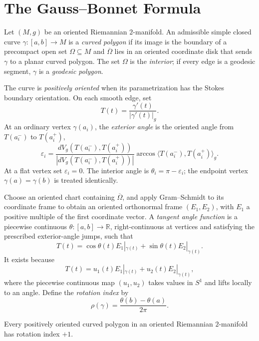 \section{The Gauss--Bonnet Formula}

Let $(M,g)$ be an oriented Riemannian $2$-manifold.  An admissible simple
closed curve $\gamma:[a,b]\to M$ is a \emph{curved polygon} if its image is
the boundary of a precompact open set $\Omega\subseteq M$ and
$\overline\Omega$ lies in an oriented coordinate disk that sends $\gamma$ to
a planar curved polygon.  The set $\Omega$ is the \emph{interior}; if every
edge is a geodesic segment, $\gamma$ is a \emph{geodesic polygon}.

The curve is \emph{positively oriented} when its parametrization has the
Stokes boundary orientation.  On each smooth edge, set
\[
T(t)=\frac{\gamma'(t)}{|\gamma'(t)|_g}.
\]
At an ordinary vertex $\gamma(a_i)$, the \emph{exterior angle} is the oriented
angle from $T(a_i^-)$ to $T(a_i^+)$,
\begin{equation}
\varepsilon_i=
\frac{dV_g(T(a_i^-),T(a_i^+))}
{|dV_g(T(a_i^-),T(a_i^+))|}
\arccos\langle T(a_i^-),T(a_i^+)\rangle_g. \tag{9.4}
\end{equation}
At a flat vertex set $\varepsilon_i=0$.  The interior angle is
$\theta_i=\pi-\varepsilon_i$; the endpoint vertex $\gamma(a)=\gamma(b)$ is
treated identically.

Choose an oriented chart containing $\overline\Omega$, and apply
Gram--Schmidt to its coordinate frame to obtain an oriented orthonormal frame
$(E_1,E_2)$, with $E_1$ a positive multiple of the first coordinate vector.
A \emph{tangent angle function} is a piecewise continuous
$\theta:[a,b]\to\mathbb R$, right-continuous at vertices and satisfying the
prescribed exterior-angle jumps, such that
\[
T(t)=\cos\theta(t)E_1|_{\gamma(t)}
+\sin\theta(t)E_2|_{\gamma(t)}.
\]
It exists because
\begin{equation}
T(t)=u_1(t)E_1|_{\gamma(t)}+u_2(t)E_2|_{\gamma(t)}, \tag{9.5}
\end{equation}
where the piecewise continuous map $(u_1,u_2)$ takes values in $S^1$ and
lifts locally to an angle.  Define the \emph{rotation index} by
\[
\rho(\gamma)=\frac{\theta(b)-\theta(a)}{2\pi}.
\]

\begin{lemma}
\label{lem:rotation-index-plus-one}
Every positively oriented curved polygon in an oriented Riemannian
$2$-manifold has rotation index $+1$.
\end{lemma}

